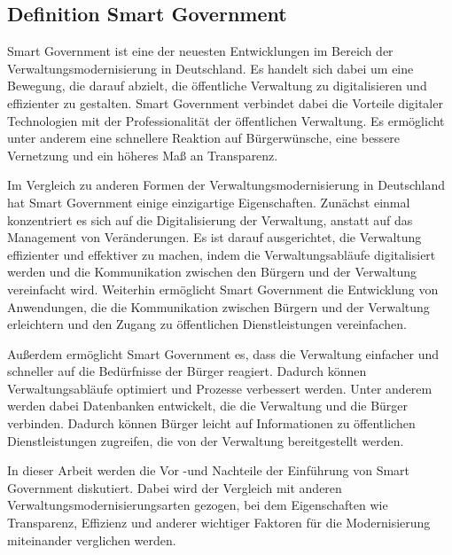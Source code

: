 \subsection{Definition Smart Government}
Smart Government ist eine der neuesten Entwicklungen im Bereich der Verwaltungsmodernisierung in Deutschland. 
Es handelt sich dabei um eine Bewegung, die darauf abzielt, die öffentliche Verwaltung zu digitalisieren und effizienter zu gestalten. 
Smart Government verbindet dabei die Vorteile digitaler Technologien mit der Professionalität der öffentlichen Verwaltung. 
Es ermöglicht unter anderem eine schnellere Reaktion auf Bürgerwünsche, eine bessere Vernetzung und ein höheres Maß an Transparenz. 
\par
Im Vergleich zu anderen Formen der Verwaltungsmodernisierung in Deutschland hat Smart Government einige einzigartige Eigenschaften. 
Zunächst einmal konzentriert es sich auf die Digitalisierung der Verwaltung, anstatt auf das Management von Veränderungen. 
Es ist darauf ausgerichtet, die Verwaltung effizienter und effektiver zu machen, indem die Verwaltungsabläufe digitalisiert werden und die Kommunikation zwischen den Bürgern und der Verwaltung vereinfacht wird. 
Weiterhin ermöglicht Smart Government die Entwicklung von Anwendungen, die die Kommunikation zwischen Bürgern und der Verwaltung erleichtern und den Zugang zu öffentlichen Dienstleistungen vereinfachen. 
\par
Außerdem ermöglicht Smart Government es, dass die Verwaltung einfacher und schneller auf die Bedürfnisse der Bürger reagiert. 
Dadurch können Verwaltungsabläufe optimiert und Prozesse verbessert werden. 
Unter anderem werden dabei Datenbanken entwickelt, die die Verwaltung und die Bürger verbinden. 
Dadurch können Bürger leicht auf Informationen zu öffentlichen Dienstleistungen zugreifen, die von der Verwaltung bereitgestellt werden.
\par
In dieser Arbeit werden die Vor -und Nachteile der Einführung von Smart Government diskutiert.
Dabei wird der Vergleich mit anderen Verwaltungsmodernisierungsarten gezogen, bei dem Eigenschaften wie Transparenz, Effizienz und anderer wichtiger Faktoren für die Modernisierung miteinander verglichen werden.
